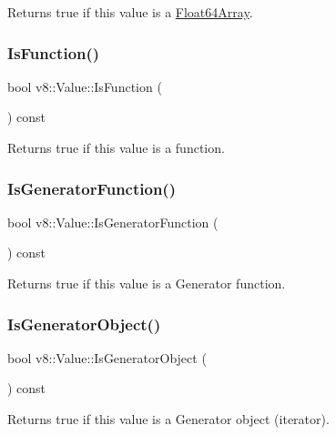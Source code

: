 Returns true if this value is a \mbox{\hyperlink{classv8_1_1Float64Array}{Float64\+Array}}. \mbox{\label{classv8_1_1Value_ac7a649d482c41cfc6281a4215a091a6d}} 
\subsubsection{\texorpdfstring{Is\+Function()}{IsFunction()}}
{\footnotesize\ttfamily bool v8\+::\+Value\+::\+Is\+Function (\begin{DoxyParamCaption}{ }\end{DoxyParamCaption}) const}

Returns true if this value is a function. \mbox{\label{classv8_1_1Value_ac0a7fcb3b244a921e5574e6f34fa9b07}} 
\subsubsection{\texorpdfstring{Is\+Generator\+Function()}{IsGeneratorFunction()}}
{\footnotesize\ttfamily bool v8\+::\+Value\+::\+Is\+Generator\+Function (\begin{DoxyParamCaption}{ }\end{DoxyParamCaption}) const}

Returns true if this value is a Generator function. \mbox{\label{classv8_1_1Value_af6f2d3199fe8b5eee219ef42574293ac}} 
\subsubsection{\texorpdfstring{Is\+Generator\+Object()}{IsGeneratorObject()}}
{\footnotesize\ttfamily bool v8\+::\+Value\+::\+Is\+Generator\+Object (\begin{DoxyParamCaption}{ }\end{DoxyParamCaption}) const}

Returns true if this value is a Generator object (iterator). \mbox{\label{classv8_1_1Value_a8db779f4ac104540e63d78e73d424195}} 
